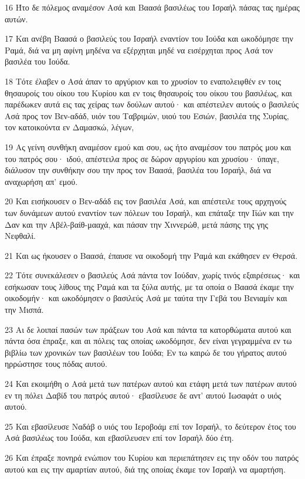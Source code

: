 \par 16 Ήτο δε πόλεμος αναμέσον Ασά και Βαασά βασιλέως του Ισραήλ πάσας τας ημέρας αυτών.
\par 17 Και ανέβη Βαασά ο βασιλεύς του Ισραήλ εναντίον του Ιούδα και ωκοδόμησε την Ραμά, διά να μη αφίνη μηδένα να εξέρχηται μηδέ να εισέρχηται προς Ασά τον βασιλέα του Ιούδα.
\par 18 Τότε έλαβεν ο Ασά άπαν το αργύριον και το χρυσίον το εναπολειφθέν εν τοις θησαυροίς του οίκου του Κυρίου και εν τοις θησαυροίς του οίκου του βασιλέως, και παρέδωκεν αυτά εις τας χείρας των δούλων αυτού· και απέστειλεν αυτούς ο βασιλεύς Ασά προς τον Βεν-αδάδ, υιόν του Ταβριμών, υιού του Εσιών, βασιλέα της Συρίας, τον κατοικούντα εν Δαμασκώ, λέγων,
\par 19 Ας γείνη συνθήκη αναμέσον εμού και σου, ως ήτο αναμέσον του πατρός μου και του πατρός σου· ιδού, απέστειλα προς σε δώρον αργυρίου και χρυσίου· ύπαγε, διάλυσον την συνθήκην σου την προς τον Βαασά, βασιλέα του Ισραήλ, διά να αναχωρήση απ' εμού.
\par 20 Και εισήκουσεν ο Βεν-αδάδ εις τον βασιλέα Ασά, και απέστειλε τους αρχηγούς των δυνάμεων αυτού εναντίον των πόλεων του Ισραήλ, και επάταξε την Ιϊών και την Δαν και την Αβέλ-βαίθ-μααχά, και πάσαν την Χιννερώθ, μετά πάσης της γης Νεφθαλί.
\par 21 Και ως ήκουσεν ο Βαασά, έπαυσε να οικοδομή την Ραμά και εκάθησεν εν Θερσά.
\par 22 Τότε συνεκάλεσεν ο βασιλεύς Ασά πάντα τον Ιούδαν, χωρίς τινός εξαιρέσεως· και εσήκωσαν τους λίθους της Ραμά και τα ξύλα αυτής, με τα οποία ο Βαασά έκαμε την οικοδομήν· και ωκοδόμησεν ο βασιλεύς Ασά με ταύτα την Γεβά του Βενιαμίν και την Μισπά.
\par 23 Αι δε λοιπαί πασών των πράξεων του Ασά και πάντα τα κατορθώματα αυτού και πάντα όσα έπραξε, και αι πόλεις τας οποίας ωκοδόμησε, δεν είναι γεγραμμένα εν τω βιβλίω των χρονικών των βασιλέων του Ιούδα; Εν τω καιρώ δε του γήρατος αυτού ηρρώστησε τους πόδας αυτού.
\par 24 Και εκοιμήθη ο Ασά μετά των πατέρων αυτού και ετάφη μετά των πατέρων αυτού εν τη πόλει Δαβίδ του πατρός αυτού· εβασίλευσε δε αντ' αυτού Ιωσαφάτ ο υιός αυτού.
\par 25 Και εβασίλευσε Ναδάβ ο υιός του Ιεροβοάμ επί τον Ισραήλ, το δεύτερον έτος του Ασά βασιλέως του Ιούδα, και εβασίλευσεν επί τον Ισραήλ δύο έτη.
\par 26 Και έπραξε πονηρά ενώπιον του Κυρίου και περιεπάτησεν εις την οδόν του πατρός αυτού και εις την αμαρτίαν αυτού, διά της οποίας έκαμε τον Ισραήλ να αμαρτήση.
